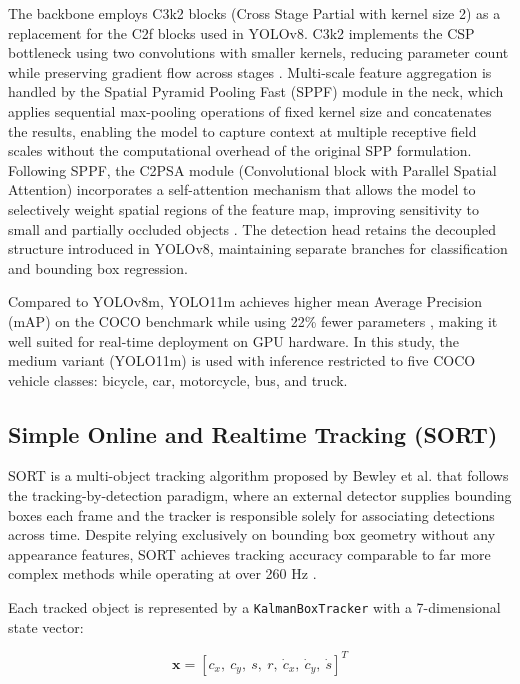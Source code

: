 The backbone employs C3k2 blocks (Cross Stage Partial with kernel size 2) as a replacement for the C2f blocks used in YOLOv8. C3k2 implements the CSP bottleneck using two convolutions with smaller kernels, reducing parameter count while preserving gradient flow across stages \cite{khanam2024yolo11}. Multi-scale feature aggregation is handled by the Spatial Pyramid Pooling Fast (SPPF) module in the neck, which applies sequential max-pooling operations of fixed kernel size and concatenates the results, enabling the model to capture context at multiple receptive field scales without the computational overhead of the original SPP formulation. Following SPPF, the C2PSA module (Convolutional block with Parallel Spatial Attention) incorporates a self-attention mechanism that allows the model to selectively weight spatial regions of the feature map, improving sensitivity to small and partially occluded objects \cite{khanam2024yolo11}. The detection head retains the decoupled structure introduced in YOLOv8, maintaining separate branches for classification and bounding box regression.

\figYOLOArchitecture

Compared to YOLOv8m, YOLO11m achieves higher mean Average Precision (mAP) on the COCO benchmark while using 22\% fewer parameters \cite{ultralytics2024}, making it well suited for real-time deployment on GPU hardware. In this study, the medium variant (YOLO11m) is used with inference restricted to five COCO vehicle classes: bicycle, car, motorcycle, bus, and truck.

\subsection{Simple Online and Realtime Tracking (SORT)}

SORT is a multi-object tracking algorithm proposed by Bewley et al. \cite{bewley2016} that follows the tracking-by-detection paradigm, where an external detector supplies bounding boxes each frame and the tracker is responsible solely for associating detections across time. Despite relying exclusively on bounding box geometry without any appearance features, SORT achieves tracking accuracy comparable to far more complex methods while operating at over 260 Hz \cite{bewley2016}.

Each tracked object is represented by a \texttt{KalmanBoxTracker} with a 7-dimensional state vector:

\begin{equation}
\mathbf{x} = [c_x,\ c_y,\ s,\ r,\ \dot{c}_x,\ \dot{c}_y,\ \dot{s}]^T
\end{equation}

